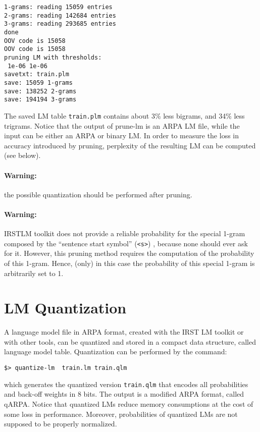 \documentclass[11pt]{article}
\begin{document}
\begin{verbatim}1-grams: reading 15059 entries
2-grams: reading 142684 entries
3-grams: reading 293685 entries
done
OOV code is 15058
OOV code is 15058
pruning LM with thresholds: 
 1e-06 1e-06
savetxt: train.plm
save: 15059 1-grams
save: 138252 2-grams
save: 194194 3-grams
\end{verbatim}

\noindent
The saved LM table {\tt train.plm}  contains about 3\% less bigrams, and 34\%  
less trigrams.
Notice that the output of prune-lm is an ARPA LM file, while the input can be 
either an ARPA or binary LM. 
In order to measure the loss in accuracy introduced
by pruning, perplexity of the resulting LM can be computed (see below).

\paragraph{Warning:} the possible quantization should be performed after pruning.

\paragraph{Warning:} 
IRSTLM toolkit does not provide a reliable probability for the special
1-gram composed by the ``sentence start symbol'' ({\tt <s>}) , because none
should ever ask for it.  However, this pruning method requires the
computation of the probability of this 1-gram.  Hence, (only) in this case
the probability of this special 1-gram is arbitrarily set to 1.

\newpage
\section{LM Quantization}
A language model file in ARPA  format, created with the IRST LM toolkit or
with other tools, can be quantized and stored in a compact data structure, 
called language model table.  Quantization can be performed by the command:

\begin{verbatim}
$> quantize-lm  train.lm train.qlm
\end{verbatim}

\noindent
which  generates   the  quantized  version  {\tt train.qlm} that  encodes all probabilities and back-off 
weights in 8 bits. The  output is a  modified ARPA format, called qARPA. Notice that quantized
LMs reduce memory consumptions at the cost of some loss in performance. Moreover, probabilities
of quantized LMs are not supposed to be properly normalized.
\end{document}
